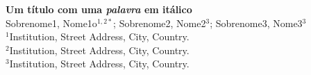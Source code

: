 
\flushleft \textbf{Um título com uma \textit{palavra} em itálico}\\ %


Sobrenome1, Nome1o$^{1,2*}$;
Sobrenome2, Nome2$^{3}$;
Sobrenome3, Nome3$^{3}$\\ %


$^{1}$Institution, Street Address, City, Country.\\
$^{2}$Institution, Street Address, City, Country.\\
$^{3}$Institution, Street Address, City, Country.


